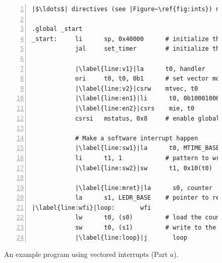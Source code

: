 \documentclass[11pt, twoside, pdftex]{article}
\begin{document}
\begin{figure}[H]
\begin{center}
\begin{minipage}[h]{15 cm}
\begin{lstlisting}[style=defaultNiosVStyle, name=vecs, numbers=left, escapechar=|]
            |$\ldots$| directives (see |Figure~\ref{fig:ints}) not| shown

.global _start
_start:     li      sp, 0x40000      # initialize the stack location
            jal     set_timer        # initialize the timer 
     
            |\label{line:v1}|la      t0, handler      # get handler address
            ori     t0, t0, 0b1      # set vector mode
            |\label{line:v2}|csrw    mtvec, t0        # set trap address and mode
            |\label{line:en1}|li      t0, 0b10001000   # set the enable pattern
            |\label{line:en2}|csrs    mie, t0          # timer & software interrupts
            csrsi   mstatus, 0x8     # enable global interrupts

            # Make a software interrupt happen
            |\label{line:sw1}|la      t0, MTIME_BASE   # base address
            li      t1, 1            # pattern to write to msip
            |\label{line:sw2}|sw      t1, 0x10(t0)     # write to msip (sw interrupt)

            |\label{line:mret}|la      s0, counter      # pointer to counter
            la      s1, LEDR_BASE    # pointer to red lights
|\label{line:wfi}|loop:       wfi
            lw      t0, (s0)         # load the counter value
            sw      t0, (s1)         # write to the lights
            |\label{line:loop}|j       loop
\end{lstlisting}
	\caption{An example program using vectored interrupts (Part $a$).}
	\label{fig:vectored}
\end{minipage}
\end{center}
\end{figure}
\end{document}
